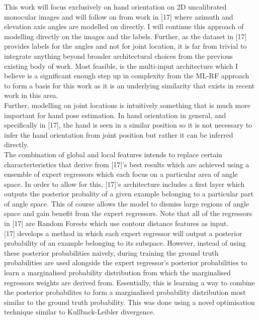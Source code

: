 \documentclass{article}
\begin{document}
This work will focus exclusively on hand orientation on 2D uncalibrated monocular images and will follow on from work in [17] where azimuth and elevation axis angles are modelled on directly. I will continue this approach of modelling directly on the images and the labels. Further, as the dataset in [17] provides labels for the angles and not for joint location, it is far from trivial to integrate anything beyond broader architectural choices from the previous existing body of work. Most feasible, is the multi-input architecture which I believe is a significant enough step up in complexity from the ML-RF approach to form a basis for this work as it is an underlying similarity that exists in recent work in this area. \\

Further, modelling on joint locations is intuitively something that is much more important for hand pose estimation. In hand orientation in general, and specifically in [17], the hand is seen in a similar position so it is not necessary to infer the hand orientation from joint position but rather it can be inferred directly.\\

The combination of global and local features intends to replace certain characterteristics that derive from [17]'s best results which are achieved using a ensemble of expert regressors which each focus on a particular area of angle space.  In order to allow for this, [17]'s architecture includes a first layer which outputs the posterior probality of a given example belonging to a particular part of angle space. This of course allows the model to dismiss large regions of angle space and gain benefit from the expert regressors. Note that all of the regressors in [17] are Random Forests which use contour distance features as input. \\

[17] develops a method in which each expert regressor will output a posterior probability of an example belonging to its subspace. However, instead of using these posterior probabilities naively, during training the ground truth probabilities are used alongside the expert regressor's posterior probabilities to learn a marginalised probability distribution from which the marginalised regressors weights are derived from. Essentially, this is learning a way to combine the  posterior probabilites to form a marginalised probability distribution most similar to the ground truth probability. This was done using a novel optimisation technique similar to  Kullback-Leibler divergence. \\
\end{document}
